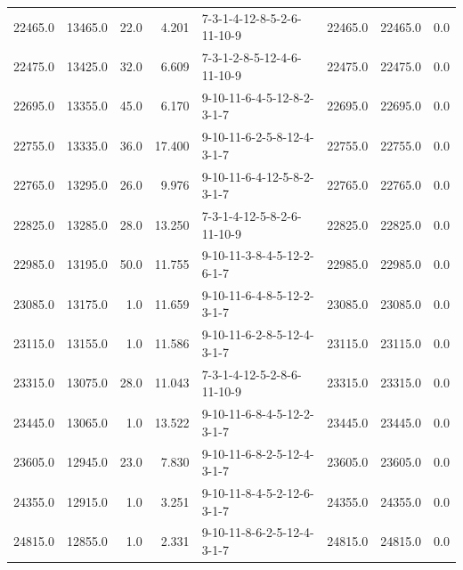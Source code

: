 \begin{tabular}{rrrrlrrr}
 22465.0 &  13465.0 &           22.0 &              4.201 &  7-3-1-4-12-8-5-2-6-11-10-9 &       22465.0 &         22465.0 &       0.0 \\
 22475.0 &  13425.0 &           32.0 &              6.609 &  7-3-1-2-8-5-12-4-6-11-10-9 &       22475.0 &         22475.0 &       0.0 \\
 22695.0 &  13355.0 &           45.0 &              6.170 &  9-10-11-6-4-5-12-8-2-3-1-7 &       22695.0 &         22695.0 &       0.0 \\
 22755.0 &  13335.0 &           36.0 &             17.400 &  9-10-11-6-2-5-8-12-4-3-1-7 &       22755.0 &         22755.0 &       0.0 \\
 22765.0 &  13295.0 &           26.0 &              9.976 &  9-10-11-6-4-12-5-8-2-3-1-7 &       22765.0 &         22765.0 &       0.0 \\
 22825.0 &  13285.0 &           28.0 &             13.250 &  7-3-1-4-12-5-8-2-6-11-10-9 &       22825.0 &         22825.0 &       0.0 \\
 22985.0 &  13195.0 &           50.0 &             11.755 &  9-10-11-3-8-4-5-12-2-6-1-7 &       22985.0 &         22985.0 &       0.0 \\
 23085.0 &  13175.0 &            1.0 &             11.659 &  9-10-11-6-4-8-5-12-2-3-1-7 &       23085.0 &         23085.0 &       0.0 \\
 23115.0 &  13155.0 &            1.0 &             11.586 &  9-10-11-6-2-8-5-12-4-3-1-7 &       23115.0 &         23115.0 &       0.0 \\
 23315.0 &  13075.0 &           28.0 &             11.043 &  7-3-1-4-12-5-2-8-6-11-10-9 &       23315.0 &         23315.0 &       0.0 \\
 23445.0 &  13065.0 &            1.0 &             13.522 &  9-10-11-6-8-4-5-12-2-3-1-7 &       23445.0 &         23445.0 &       0.0 \\
 23605.0 &  12945.0 &           23.0 &              7.830 &  9-10-11-6-8-2-5-12-4-3-1-7 &       23605.0 &         23605.0 &       0.0 \\
 24355.0 &  12915.0 &            1.0 &              3.251 &  9-10-11-8-4-5-2-12-6-3-1-7 &       24355.0 &         24355.0 &       0.0 \\
 24815.0 &  12855.0 &            1.0 &              2.331 &  9-10-11-8-6-2-5-12-4-3-1-7 &       24815.0 &         24815.0 &       0.0 \\
\bottomrule
\end{tabular}
